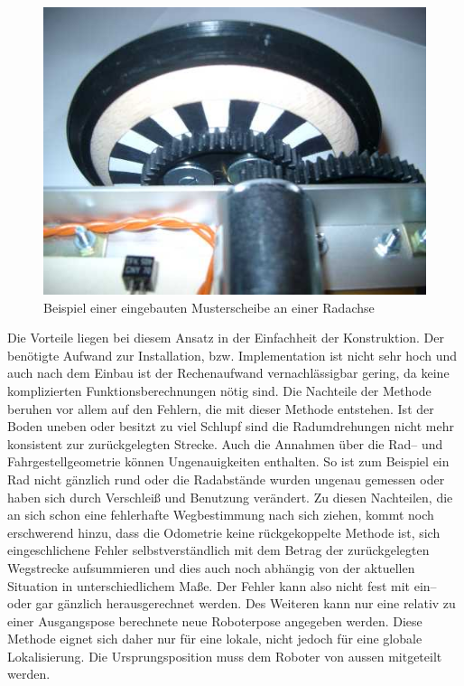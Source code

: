\begin{figure}[h]
\center
\includegraphics[scale=0.5]{graphics/odo_einbau.jpg}
\caption{\label{fig:Odo_Einbau} Beispiel einer eingebauten Musterscheibe an einer Radachse\citep{odom}}
\end{figure}

Die Vorteile liegen bei diesem Ansatz in der Einfachheit der Konstruktion. Der benötigte Aufwand zur Installation, bzw. Implementation ist nicht sehr hoch und auch nach dem Einbau ist der Rechenaufwand vernachlässigbar gering, da keine komplizierten Funktionsberechnungen nötig sind. Die Nachteile der Methode beruhen vor allem auf den Fehlern, die mit dieser Methode entstehen. Ist der Boden uneben oder besitzt zu viel Schlupf sind die Radumdrehungen nicht mehr konsistent zur zurückgelegten Strecke. Auch die Annahmen über die Rad-- und Fahrgestellgeometrie können Ungenauigkeiten enthalten. So ist zum Beispiel ein Rad nicht gänzlich rund oder die Radabstände wurden ungenau gemessen oder haben sich durch Verschleiß und Benutzung verändert. Zu diesen Nachteilen, die an sich schon eine fehlerhafte Wegbestimmung nach sich ziehen, kommt noch erschwerend hinzu, dass die Odometrie keine rückgekoppelte Methode ist, sich eingeschlichene Fehler selbstverständlich mit dem Betrag der zurückgelegten Wegstrecke aufsummieren und dies auch noch abhängig von der aktuellen Situation in unterschiedlichem Maße. Der Fehler kann also nicht fest mit ein-- oder gar gänzlich herausgerechnet werden. Des Weiteren kann nur eine relativ zu einer Ausgangspose berechnete neue Roboterpose angegeben werden. Diese Methode eignet sich daher nur für eine lokale, nicht jedoch für eine globale Lokalisierung. Die Ursprungsposition muss dem Roboter von aussen mitgeteilt werden.

